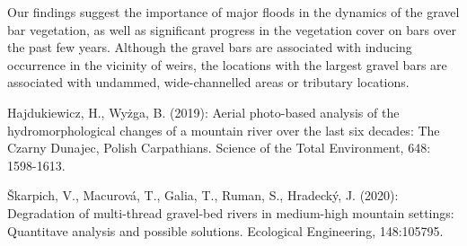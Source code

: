{Our findings suggest the importance of major floods in the dynamics of the gravel bar vegetation, as well as significant progress in the vegetation cover on bars over the past few years. Although the gravel bars are associated with inducing occurrence in the vicinity of weirs, the locations with the largest gravel bars are associated with undammed, wide-channelled areas or tributary locations.
}
{Hajdukiewicz, H., Wyżga, B. (2019): Aerial photo-based analysis of the hydromorphological changes of a mountain river over the last six decades: The Czarny Dunajec, Polish Carpathians. Science of the Total Environment, 648: 1598-1613.

Škarpich, V., Macurová, T., Galia, T., Ruman, S., Hradecký, J. (2020): Degradation of multi-thread gravel-bed rivers in medium-high mountain settings: Quantitave analysis and possible solutions. Ecological Engineering, 148:105795.

}

